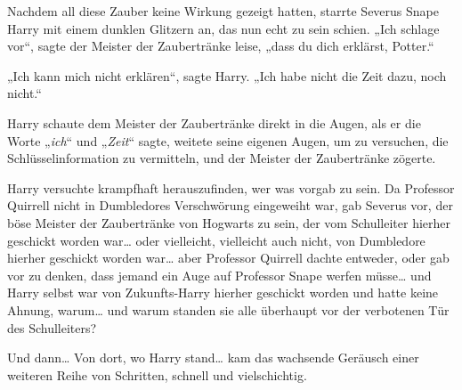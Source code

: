 Nachdem all diese Zauber keine Wirkung gezeigt hatten, starrte Severus Snape Harry mit einem dunklen Glitzern an, das nun echt zu sein schien.
„Ich schlage vor“, sagte der Meister der Zaubertränke leise, „dass du dich erklärst, Potter.“

„Ich kann mich nicht erklären“, sagte Harry. „Ich habe nicht die Zeit dazu, noch nicht.“

Harry schaute dem Meister der Zaubertränke direkt in die Augen, als er die Worte „\emph{ich}“ und „\emph{Zeit}“ sagte, weitete seine eigenen Augen, um zu versuchen, die Schlüsselinformation zu vermitteln, und der Meister der Zaubertränke zögerte.

Harry versuchte krampfhaft herauszufinden, wer was vorgab zu sein. Da Professor Quirrell nicht in Dumbledores Verschwörung eingeweiht war, gab Severus vor, der böse Meister der Zaubertränke von Hogwarts zu sein, der vom Schulleiter hierher geschickt worden war… oder vielleicht, vielleicht auch nicht, von Dumbledore hierher geschickt worden war… aber Professor Quirrell dachte entweder, oder gab vor zu denken, dass jemand ein Auge auf Professor Snape werfen müsse… und Harry selbst war von Zukunfts-Harry hierher geschickt worden und hatte keine Ahnung, warum… und warum standen sie alle überhaupt vor der verbotenen Tür des Schulleiters?



Und dann… Von dort, wo Harry stand… kam das wachsende Geräusch einer weiteren Reihe von Schritten, schnell und vielschichtig.

